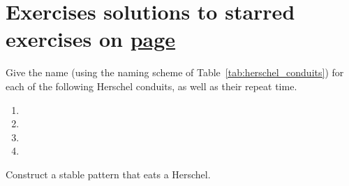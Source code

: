 \section*{Exercises \hfill \normalfont\textsf{\small solutions to starred exercises on \hyperlink{solutions_stable_circuitry}{page \pageref{solutions_stable_circuitry}}}}
\label{sec:stable_exercises}
\vspace*{-0.4cm}\hrulefill\vspace*{-0.3cm}\footnotesize\begin{multicols}{2}\vspace*{-0.4cm}\raggedcolumns{}
	\setlength{\parskip}{0pt}
	
	\begin{problemstar}\label{exer:name_conduit} 
		Give the name (using the naming scheme of Table~\ref{tab:herschel_conduits}) for each of the following Herschel conduits, as well as their repeat time.\vspace*{-0.25cm}
		
		\begin{multicols}{2}
			\begin{enumerate}
				\item[\bf\color{ocre}(a)] 
				
				\item[\bf\color{ocre}(c)] 
				
				\item[\bf\color{ocre}(b)] 
				
				\item[\bf\color{ocre}(d)] 
			\end{enumerate}
		\end{multicols}
	\end{problemstar}
	
	
	\mfilbreak
	
	
	\begin{problem}\label{exer:eat_herschel} 
		Construct a stable pattern that eats a Herschel.
		
	\end{problem}
	

\end{multicols}
